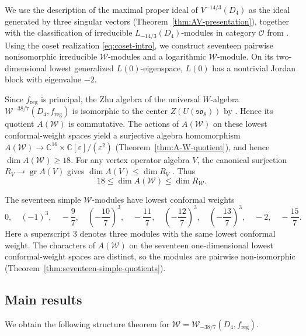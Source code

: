 \documentclass[11pt]{amsart}
\numberwithin{equation}{section}
\theoremstyle{definition}
\theoremstyle{remark}
\newcommand{\W}{\mathcal W}
\newcommand{\reg}{\mathrm{reg}}
\begin{document}
We use the description of the maximal proper ideal of
$V^{-14/3}(D_4)$ as the ideal generated by three singular vectors
(Theorem~\ref{thm:AV-presentation}), together with the classification
of irreducible $L_{-14/3}(D_4)$-modules in category $\mathcal O$
from \cite[Proposition~3.4 and Theorem~3.6]{AV}.
Using the coset realization \eqref{eq:coset-intro}, we construct
seventeen pairwise nonisomorphic irreducible $\mathcal W$-modules
and a logarithmic $\mathcal W$-module. On its two-dimensional lowest
generalized $L(0)$-eigenspace, $L(0)$ has a nontrivial Jordan block
with eigenvalue $-2$.


Since $f_{\mathrm{reg}}$ is principal, the Zhu algebra of the universal
$W$-algebra $\mathcal W^{-38/7}(D_4,f_{\mathrm{reg}})$ is isomorphic
to the center $Z(U(\mathfrak{so}_8))$
by \cite[Theorem~4.16.3(ii)]{Ara07}.
Hence its quotient $A(\mathcal W)$ is commutative.
The actions of $A(\mathcal W)$ on these lowest conformal-weight spaces
yield a surjective algebra homomorphism
$
 A(\mathcal W)\longrightarrow
 \mathbb C^{16}\times\mathbb C[\varepsilon]/(\varepsilon^2)
$
(Theorem~\ref{thm:A-W-quotient}), and hence $\dim A(\mathcal W)\geq18$.
For any vertex operator algebra $V$, the canonical surjection
$R_V\longrightarrow\operatorname{gr}A(V)$ gives
$\dim A(V)\leq\dim R_V$ \cite[Proposition~3.3]{ALY}. Thus
\[
 18\leq\dim A(\mathcal W)\leq\dim R_{\mathcal W}.
\]

The seventeen simple $\mathcal W$-modules have lowest conformal weights
\[
 0,\quad (-1)^3,\quad -\frac97,\quad
 \left(-\frac{10}7\right)^3,\quad -\frac{11}7,\quad
 \left(-\frac{12}7\right)^3,\quad
 \left(-\frac{13}7\right)^3,\quad -2,\quad -\frac{15}7.
\]
Here a superscript $3$ denotes three modules with the same lowest
conformal weight. The characters of $A(\mathcal W)$ on the seventeen
one-dimensional lowest conformal-weight spaces are distinct, so the modules
are pairwise non-isomorphic (Theorem~\ref{thm:seventeen-simple-quotients}).
\subsection*{Main results}

We obtain the following structure theorem for
$\mathcal W=\W_{-38/7}(D_4,f_{\reg})$.
\end{document}
